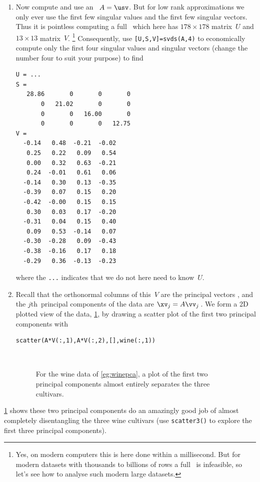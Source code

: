 \begin{example}
\begin{solution}
\begin{enumerate}
\item Now compute and use an \svd\ \(A=\usv\).
But for low rank approximations we only ever use the first few singular values and the first few singular vectors.
Thus it is pointless computing a full \svd\ which here has \(178\times178\) matrix~\(U\) and \(13\times13\) matrix~\(V\).%
\footnote{Yes, on modern computers this is here done within a millisecond.  
But for modern datasets with thousands to billions of rows a full \svd\ is infeasible, so let's see how to analyse such modern large datasets.}
Consequently, use \verb|[U,S,V]=svds(A,4)| to economically compute only the first four singular values and singular vectors (change the number four to suit your purpose) to find \twodp
\begin{verbatim}
U = ...
S =
   28.86       0       0       0
       0   21.02       0       0
       0       0   16.00       0
       0       0       0   12.75
V =
  -0.14   0.48  -0.21  -0.02
   0.25   0.22   0.09   0.54
   0.00   0.32   0.63  -0.21
   0.24  -0.01   0.61   0.06
  -0.14   0.30   0.13  -0.35
  -0.39   0.07   0.15   0.20
  -0.42  -0.00   0.15   0.15
   0.30   0.03   0.17  -0.20
  -0.31   0.04   0.15   0.40
   0.09   0.53  -0.14   0.07
  -0.30  -0.28   0.09  -0.43
  -0.38  -0.16   0.17   0.18
  -0.29   0.36  -0.13  -0.23
\end{verbatim}
where the \verb|...| indicates that we do not here need to know~\(U\).

\item Recall that the orthonormal columns of this~\(V\) are the principal vectors \hlist{}, and the \(j\)th~principal components of the data are \(\xv_j=A\vv_j\)\,.
We form a 2D plotted view of the data, \cref{fig:winepca}, by drawing a scatter plot of the first two principal components with 
\begin{verbatim}
scatter(A*V(:,1),A*V(:,2),[],wine(:,1))
\end{verbatim}
\begin{figure}
\centering
\\
\caption{For the wine data of \cref{eg:winepca}, a plot of the first two principal components almost entirely separates the three cultivars.}
\label{fig:winepca}
\end{figure}
\end{enumerate}
\cref{fig:winepca} shows these two principal components do an amazingly good job of almost completely disentangling the three wine cultivars (use \verb|scatter3()| to explore the first three principal components).
\end{solution}
\end{example}


